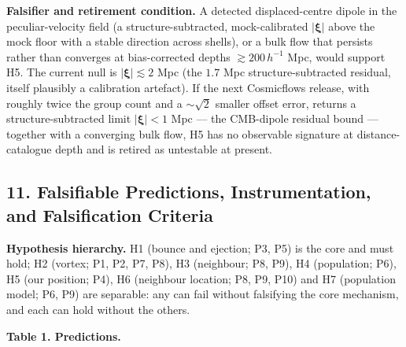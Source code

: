 \documentclass[
]{article}
\begin{document}
\textbf{Falsifier and retirement condition.} A detected displaced-centre
dipole in the peculiar-velocity field (a structure-subtracted,
mock-calibrated \(|\boldsymbol{\xi}|\) above the mock floor with a
stable direction across shells), or a bulk flow that persists rather
than converges at bias-corrected depths \(\gtrsim 200\,h^{-1}\) Mpc,
would support H5. The current null is \(|\boldsymbol{\xi}| \lesssim 2\)
Mpc (the \(1.7\) Mpc structure-subtracted residual, itself plausibly a
calibration artefact). If the next Cosmicflows release, with roughly
twice the group count and a \(\sim\!\sqrt{2}\) smaller offset error,
returns a structure-subtracted limit \(|\boldsymbol{\xi}| < 1\) Mpc ---
the CMB-dipole residual bound --- together with a converging bulk flow,
H5 has no observable signature at distance-catalogue depth and is
retired as untestable at present.

\hypertarget{falsifiable-predictions-instrumentation-and-falsification-criteria}{%
\subsection{\texorpdfstring{\textbf{11. Falsifiable Predictions,
Instrumentation, and Falsification
Criteria}}{11. Falsifiable Predictions, Instrumentation, and Falsification Criteria}}\label{falsifiable-predictions-instrumentation-and-falsification-criteria}}

\textbf{Hypothesis hierarchy.} H1 (bounce and ejection; P3, P5) is the
core and must hold; H2 (vortex; P1, P2, P7, P8), H3 (neighbour; P8, P9),
H4 (population; P6), H5 (our position; P4), H6 (neighbour location; P8,
P9, P10) and H7 (population model; P6, P9) are separable: any can fail
without falsifying the core mechanism, and each can hold without the
others.

\textbf{Table 1. Predictions.}
\end{document}
